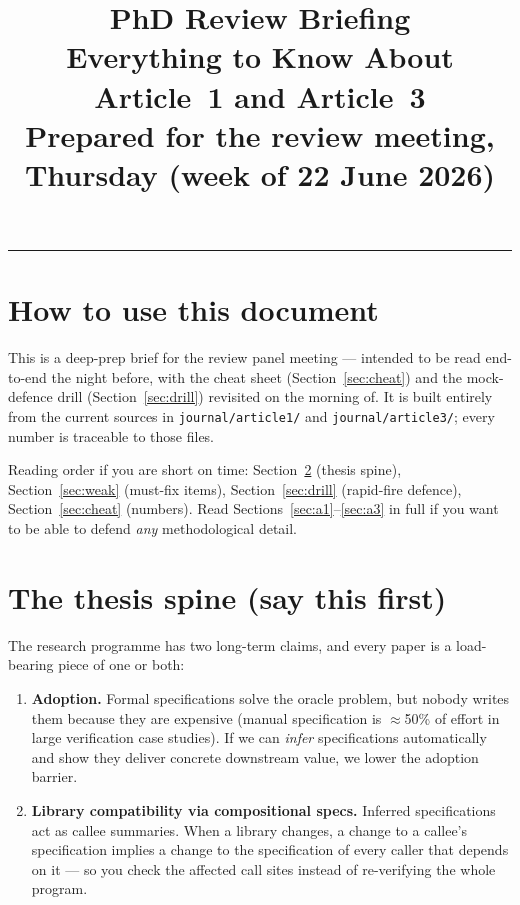 \documentclass[11pt]{article}
\title{\vspace{-2.5em}\textbf{PhD Review Briefing}\\[0.3em]
\large Everything to Know About Article~1 and Article~3\\[0.2em]
\normalsize Prepared for the review meeting, Thursday (week of 22 June 2026)}
\author{}
\date{}
\begin{document}
\maketitle
\thispagestyle{fancy}
\vspace{-3em}

\tableofcontents
\vspace{1em}
\hrule

\section{How to use this document}

This is a deep-prep brief for the review panel meeting --- intended to be
read end-to-end the night before, with the cheat sheet
(Section~\ref{sec:cheat}) and the mock-defence drill (Section~\ref{sec:drill})
revisited on the morning of. It is built entirely from the current sources in
\texttt{journal/article1/} and \texttt{journal/article3/}; every number is
traceable to those files.

Reading order if you are short on time: Section~\ref{sec:thesis} (thesis
spine), Section~\ref{sec:weak} (must-fix items), Section~\ref{sec:drill}
(rapid-fire defence), Section~\ref{sec:cheat} (numbers). Read
Sections~\ref{sec:a1}--\ref{sec:a3} in full if you want to be able to defend
\emph{any} methodological detail.

\section{The thesis spine (say this first)}
\label{sec:thesis}

The research programme has two long-term claims, and every paper is a
load-bearing piece of one or both:

\begin{enumerate}[leftmargin=1.6em,itemsep=0.2em]
  \item \textbf{Adoption.} Formal specifications solve the oracle problem, but
        nobody writes them because they are expensive (manual specification is
        $\approx$50\% of effort in large verification case studies). If we can
        \emph{infer} specifications automatically and show they deliver
        concrete downstream value, we lower the adoption barrier.
  \item \textbf{Library compatibility via compositional specs.} Inferred
        specifications act as callee summaries. When a library changes, a
        change to a callee's specification implies a change to the
        specification of every caller that depends on it --- so you check the
        affected call sites instead of re-verifying the whole program.
\end{enumerate}
\end{document}

